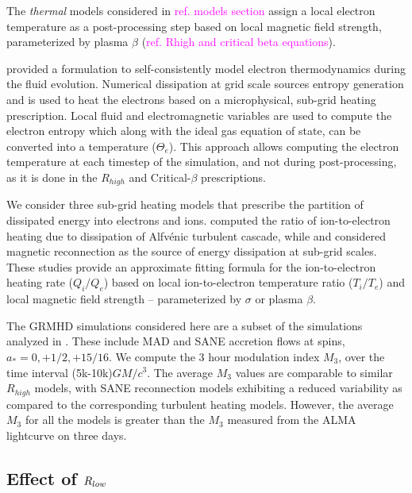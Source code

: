 The \textit{thermal} models considered in \textcolor{magenta}{ref. models section} assign a local electron temperature as a post-processing step based on local magnetic field strength, parameterized by plasma $\beta$ (\textcolor{magenta}{ref. Rhigh and critical beta equations}).

\citealt{10.1093/mnras/stv2084} provided a formulation to self-consistently model electron thermodynamics during the fluid evolution. Numerical dissipation at grid scale sources entropy generation and is used to heat the electrons based on a microphysical, sub-grid heating prescription. Local fluid and electromagnetic variables are used to compute the electron entropy which along with the ideal gas equation of state, can be converted into a temperature ($\Theta_{e}$). This approach allows computing the electron temperature at each timestep of the simulation, and not during post-processing, as it is done in the $R_{high}$ and Critical-$\beta$ prescriptions.

We consider three sub-grid heating models that prescribe the partition of dissipated energy into electrons and ions. \citealt{2010MNRAS.409L.104H} computed the ratio of ion-to-electron heating due to dissipation of Alfv\'enic turbulent cascade, while \citealt{10.1093/mnras/stx2530} and \citealt{Rowan_2017} considered magnetic reconnection as the source of energy dissipation at sub-grid scales. These studies provide an approximate fitting formula for the ion-to-electron heating rate ($Q_{i}/Q_{e}$) based on local ion-to-electron temperature ratio ($T_{i}/T_{e}$) and local magnetic field strength -- parameterized by $\sigma$ or plasma $\beta$.

The GRMHD simulations considered here are a subset of the simulations analyzed in \citealt{2020MNRAS.494.4168D}. These include MAD and SANE accretion flows at spins, $a_{*}=0,+1/2,+15/16$. We compute the 3 hour modulation index $M_{3}$, over the time interval (5k-10k)$GM/c^{3}$. The average $M_{3}$ values are comparable to similar $R_{high}$ models, with SANE reconnection models exhibiting a reduced variability as compared to the corresponding turbulent heating models. However, the average $M_{3}$ for all the models is greater than the $M_{3}$ measured from the ALMA lightcurve on three days.

\subsection{Effect of $R_{\lowercase{low}}$}

